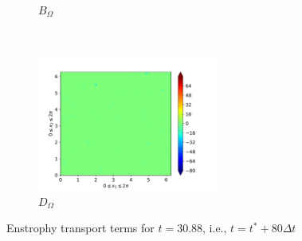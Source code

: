 \begin{figure}[H]
\begin{subfigure}{0.45\textwidth}
        \caption{$B_{\Omega}$}
    \end{subfigure}
    ~
    \begin{subfigure}{0.45\textwidth}
        \includegraphics[height=1.75in]{media/run-cds-65/D-enst-1420}
        \caption{$D_{\Omega}$}
    \end{subfigure}
    \caption{Enstrophy transport terms for $t=30.88$, i.e., $t=t^{\ast} + 80 \Delta t$}
\end{figure}

\newpage

